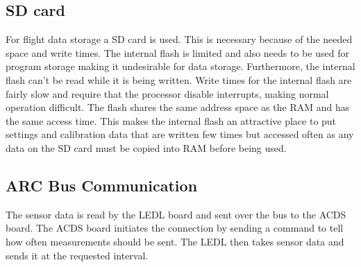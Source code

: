 \subsection{SD card}

For flight data storage a SD card is used. This is necessary because of the needed space and write times. The internal flash is limited and also needs to be used for program storage making it undesirable for data storage. Furthermore, the internal flash can't be read while it is being written. Write times for the internal flash are fairly slow and require that the processor disable interrupts, making normal operation difficult. The flash shares the same address space as the \ac{RAM} and has the same access time. This makes the internal flash an attractive place to put settings and calibration data that are written few times but accessed often as any data on the SD card must be copied into \ac{RAM} before being used.

\subsection{\acs*{ARC} Bus Communication}

The sensor data is read by the \ac{LEDL} board and sent over the bus to the \ac{ACDS} board. The \ac{ACDS} board initiates the connection by sending a command to tell how often measurements should be sent. The \ac{LEDL} then takes sensor data and sends it at the requested interval.

